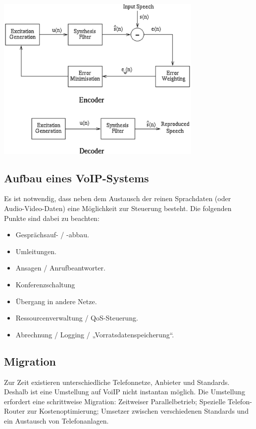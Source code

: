 \documentclass{article} %
\begin{document}
\begin{center}
	\includegraphics[width=10cm]{img/hybridVoIP.png}
\end{center}
\subsection{Aufbau eines VoIP-Systems}
Es ist notwendig, dass neben dem Austausch der reinen Sprachdaten (oder Audio-Video-Daten) eine Möglichkeit zur Steuerung besteht. Die folgenden Punkte sind dabei zu beachten:
\begin{itemize}
	\item Gesprächsauf- / -abbau.
	\item Umleitungen.
	\item Ansagen / Anrufbeantworter.
	\item Konferenzschaltung
	\item Übergang in andere Netze.
	\item Ressourcenverwaltung / QoS-Steuerung.
	\item Abrechnung / Logging / „Vorratsdatenspeicherung“.
\end{itemize}

\subsection{Migration}
Zur Zeit existieren unterschiedliche Telefonnetze, Anbieter und Standards. Deshalb ist eine Umstellung auf VoiIP nicht instantan möglich. Die Umstellung erfordert eine schrittweise Migration: Zeitweiser Parallelbetrieb; Spezielle Telefon-Router zur Kostenoptimierung; Umsetzer zwischen verschiedenen Standards und ein Austausch von Telefonanlagen.
\end{document}
